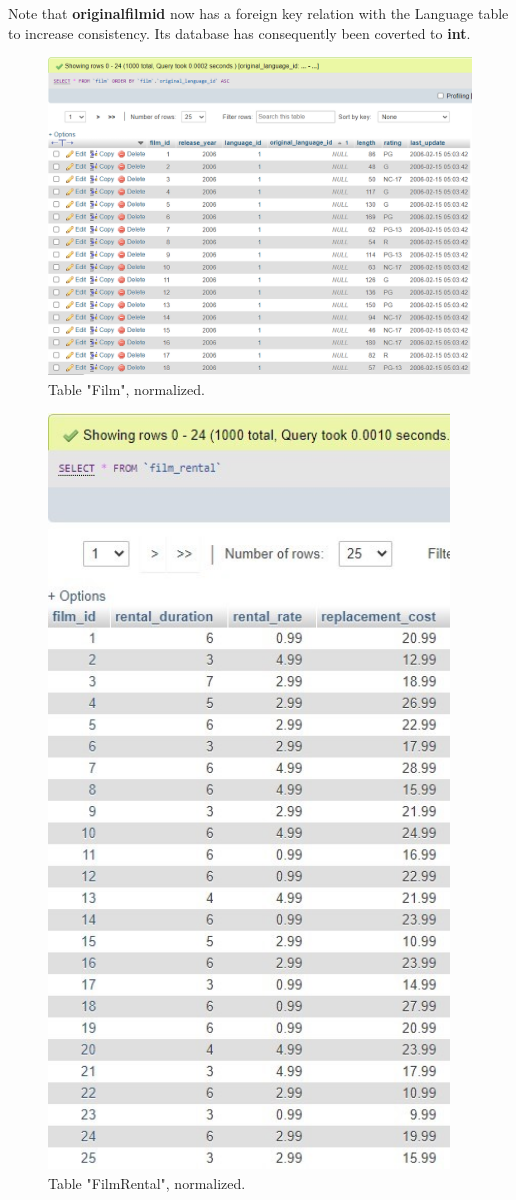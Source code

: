 \documentclass{article}
\begin{document}
		Note that \textbf{original\textunderscore film\textunderscore id} now has a foreign key relation with the Language table to increase consistency. Its database has consequently been coverted to \textbf{int}.
		\begin{figure}[H]
			\includegraphics[width=\textwidth]{table_film_norm}
			\caption{Table "Film", normalized.}
		\end{figure}
		\begin{figure}[H]
			\includegraphics[height = 20cm]{table_filmrental_norm}
			\caption{Table "Film\textunderscore Rental", normalized.}
		\end{figure}
\end{document}
